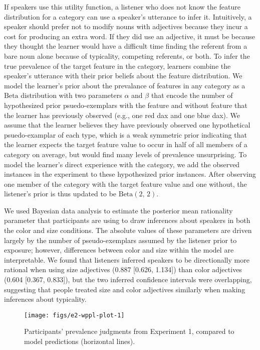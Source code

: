 \documentclass{ucetd}
\begin{document}
If speakers use this utility function, a listener who does not know the
feature distribution for a category can use a speaker's utterance to
infer it. Intuitively, a speaker should prefer not to modify nouns with
adjectives because they incur a cost for producing an extra word. If
they did use an adjective, it must be because they thought the learner
would have a difficult time finding the referent from a bare noun alone
because of typicality, competing referents, or both. To infer the true
prevalence of the target feature in the category, learners combine the
speaker's utterance with their prior beliefs about the feature
distribution. We model the learner's prior about the prevalance of
features in any category as a \(\text{Beta}\) distribution with two
parameters \(\alpha\) and \(\beta\) that encode the number of
hypothesized prior psuedo-exemplars with the feature and without feature
that the learner has previously observed (e.g., one red dax and one blue
dax). We assume that the learner believes they have previously observed
one hypothetical psuedo-examplar of each type, which is a weak symmetric
prior indicating that the learner expects the target feature value to
occur in half of all members of a category on average, but would find
many levels of prevalence unsurprising. To model the learner's direct
experience with the category, we add the observed instances in the
experiment to these hypothesized prior instances. After observing one
member of the category with the target feature value and one without,
the listener's prior is thus updated to be
\(\text{Beta}\left(2,\,2\right)\).

We used Bayesian data analysis to estimate the posterior mean
rationality parameter that participants are using to draw inferences
about speakers in both the color and size conditions. The absolute
values of these parameters are driven largely by the number of
pseudo-exemplars assumed by the listener prior to exposure; however,
differences between color and size within the model are interpretable.
We found that listeners inferred speakers to be directionally more
rational when using size adjectives (0.887 {[}0.626, 1.134{]}) than
color adjectives (0.604 {[}0.367, 0.833{]}), but the two inferred
confidence intervals were overlapping, suggesting that people treated
size and color adjectives similarly when making inferences about
typicality.

\begin{figure}[!tb]

{\centering \texttt{[image: figs/e2-wppl-plot-1]} 

}

\caption{Participants' prevalence judgments from Experiment 1, compared to model predictions (horizontal lines).}\label{fig:e2-wppl-plot}
\end{figure}
\end{document}
